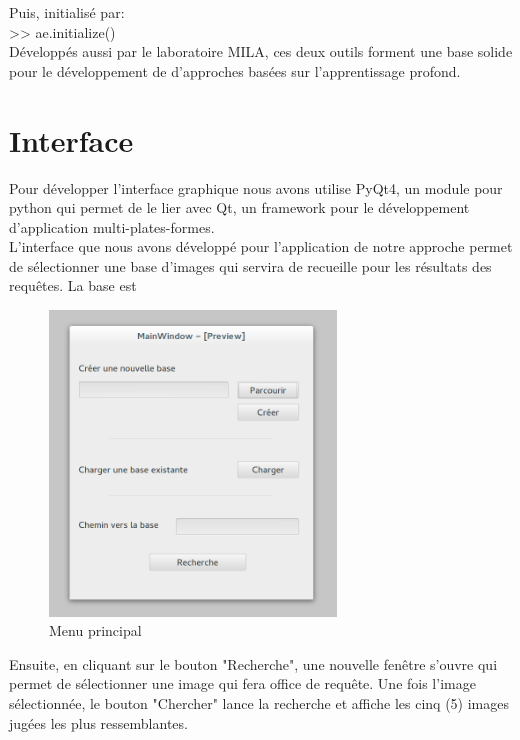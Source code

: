 Puis, initialisé par:\\

>> ae.initialize()\\

Développés aussi par le laboratoire MILA, ces deux outils forment une base solide pour le développement de d’approches basées sur l'apprentissage profond.

\section{Interface}

Pour développer l'interface graphique nous avons utilise PyQt4, un module pour python qui permet de le lier avec Qt, un framework pour le développement d'application multi-plates-formes.\\

L'interface que nous avons développé pour l'application de notre approche permet de sélectionner une base d'images qui servira de recueille pour les résultats des requêtes. La base est 


\begin{figure}[H]
	\centering
		\includegraphics[width=3in]{Figures/mainMenu.png}
	\caption[Menu principal]{Menu principal}
	\label{fig:Electron}
\end{figure}


Ensuite, en cliquant sur le bouton "Recherche", une nouvelle fenêtre s'ouvre qui permet de sélectionner une image qui fera office de requête. Une fois l'image sélectionnée, le bouton "Chercher" lance la recherche et affiche les cinq (5) images jugées les plus ressemblantes. 


